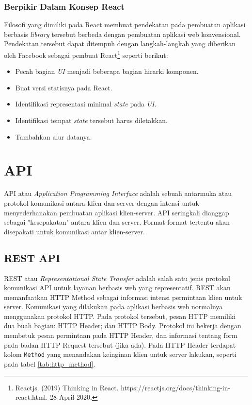     
    \subsubsection{Berpikir Dalam Konsep React}
    Filosofi yang dimiliki pada React membuat pendekatan pada pembuatan aplikasi
    berbasis \textit{library} tersebut berbeda dengan pembuatan aplikasi web 
    konvensional. Pendekatan tersebut dapat ditempuh dengan langkah-langkah yang diberikan 
    oleh Facebook sebagai pembuat React\footnote{Reactjs. (2019) Thinking in
    React. https://reactjs.org/docs/thinking-in-react.html. 28 April 2020.} 
    seperti berikut:
    
    \begin{itemize}
        \item Pecah bagian \textit{UI} menjadi beberapa bagian hirarki komponen.
        
        \item Buat versi statisnya pada React.
        
        \item Identifikasi representasi minimal \textit{state} pada \textit{UI}.
        
        \item Identifikasi tempat \textit{state} tersebut harus diletakkan.
        
        \item Tambahkan alur datanya.
    \end{itemize}
    
    
\section{API}
    API atau \textit{Application Programming Interface} adalah sebuah antarmuka
    atau protokol komunikasi antara klien dan server dengan intensi untuk
    menyederhanakan pembuatan aplikasi klien-server. API seringkali dianggap
    sebagai "kesepakatan" antara klien dan server. Format-format tertentu akan
    disepakati untuk komunikasi antar klien-server\cite{health-informatics}.
    
    \subsection{REST API}
    REST atau \textit{Representational State Transfer} adalah salah satu jenis
    protokol komunikasi API untuk layanan berbasis web yang
    representatif\cite{rest:roy-fielding}. REST akan memanfaatkan HTTP Method
    sebagai informasi intensi permintaan klien untuk server. Komunikasi yang
    dilakukan pada aplikasi berbasis web normalnya menggunakan protokol HTTP.
    Pada protokol tersebut, pesan HTTP memiliki dua buah bagian: HTTP Header;
    dan HTTP Body\cite{RFC7231}. Protokol ini bekerja dengan membetuk pesan
    permintaan pada HTTP Header, dan informasi tentang form pada badan HTTP
    Request tersebut (jika ada). Pada HTTP Header terdapat kolom \texttt{Method}
    yang menandakan keinginan klien untuk server lakukan, seperti pada tabel
    \ref{tab:http_method}\cite[P.~21]{RFC7231}.
    
